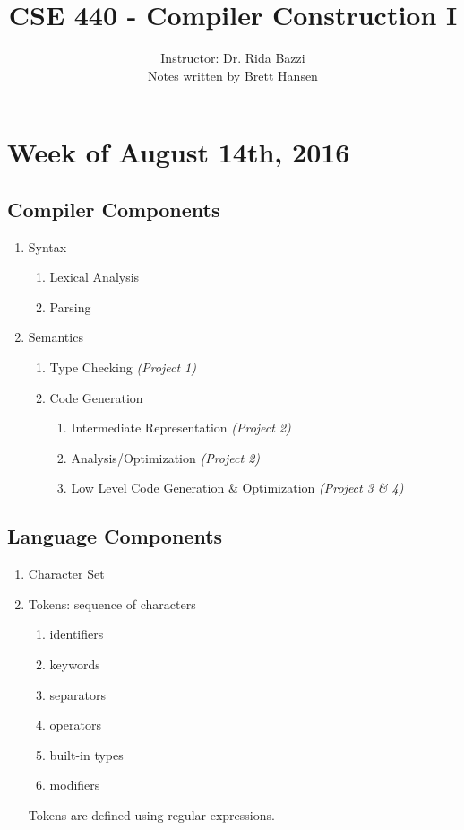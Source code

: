 \documentclass{article}
\title{CSE 440 - Compiler Construction I}
\author{
{\Large Instructor: Dr. Rida Bazzi} \\
		Notes written by Brett Hansen
}
\date{}
\begin{document}
\maketitle
\tableofcontents
\break

\section{Week of August 14th, 2016}
\subsection{Compiler Components}

\begin{enumerate}
	\item Syntax
	\begin{enumerate}
		\item Lexical Analysis
		\item Parsing
	\end{enumerate}
	\item Semantics
	\begin{enumerate}
		\item Type Checking \textit{(Project 1)}
		\item Code Generation
		\begin{enumerate}
			\item Intermediate Representation \textit{(Project 2)}
			\item Analysis/Optimization \textit{(Project 2)}
			\item Low Level Code Generation \& Optimization \textit{(Project 3 \& 4)}
		\end{enumerate}
	\end{enumerate}
\end{enumerate}

\subsection{Language Components}

\begin{enumerate}
	\item Character Set
	\item Tokens: sequence of characters
	\begin{enumerate}
		\item identifiers
		\item keywords
		\item separators
		\item operators
		\item built-in types
		\item modifiers
	\end{enumerate}
	Tokens are defined using regular expressions.
\end{enumerate}
\end{document}

